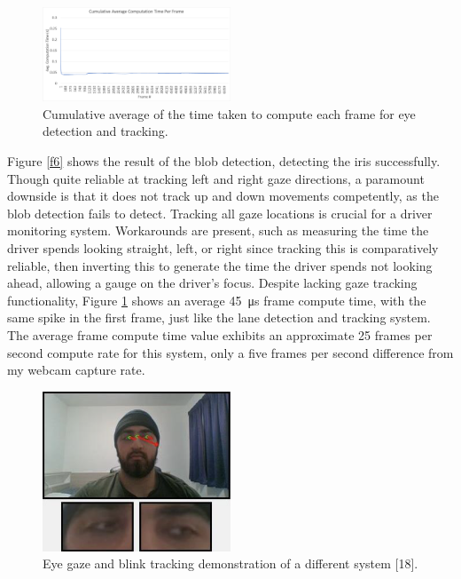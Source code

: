 \documentclass[10pt,conference]{IEEEtran}
\begin{document}
\begin{figure}[htbp]
    \centerline{\includegraphics[width=0.5\textwidth]{assets/Eye_Avg-FPT.png}}
    \caption{Cumulative average of the time taken to compute each frame for eye detection and tracking.}
    \label{f7}
\end{figure}

Figure \ref{f6} shows the result of the blob detection, detecting the iris successfully. Though quite reliable at tracking left and right gaze directions, a paramount downside is that it does not track up and down movements competently, as the blob detection fails to detect. Tracking all gaze locations is crucial for a driver monitoring system. Workarounds are present, such as measuring the time the driver spends looking straight, left, or right since tracking this is comparatively reliable, then inverting this to generate the time the driver spends not looking ahead, allowing a gauge on the driver's focus. Despite lacking gaze tracking functionality, Figure \ref{f7} shows an average \SI{45}{\micro\second} frame compute time, with the same spike in the first frame, just like the lane detection and tracking system. The average frame compute time value exhibits an approximate 25 frames per second compute rate for this system, only a five frames per second difference from my webcam capture rate.

\begin{figure}[htbp]
    \centerline{\includegraphics[width=0.5\textwidth]{assets/Gagan-eye.png}}
    \caption{Eye gaze and blink tracking demonstration of a different system [18].}
    \label{f8}
\end{figure}
\end{document}
